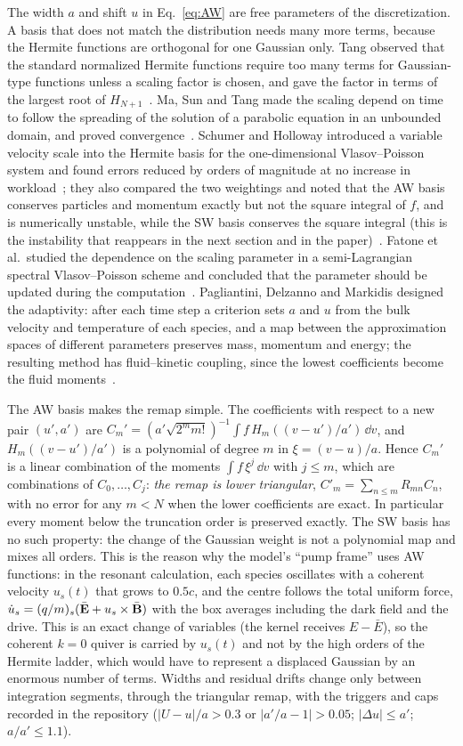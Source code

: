The width $a$ and shift $u$ in Eq.~\eqref{eq:AW} are free parameters of the discretization. A basis that does not match the distribution needs many more terms, because the Hermite functions are orthogonal for one Gaussian only. Tang observed that the standard normalized Hermite functions require too many terms for Gaussian-type functions unless a scaling factor is chosen, and gave the factor in terms of the largest root of $H_{N+1}$~\citep{Tang1993}. Ma, Sun and Tang made the scaling depend on time to follow the spreading of the solution of a parabolic equation in an unbounded domain, and proved convergence~\citep{MaSunTang2005}. Schumer and Holloway introduced a variable velocity scale into the Hermite basis for the one-dimensional Vlasov--Poisson system and found errors reduced by orders of magnitude at no increase in workload~\citep{SchumerHolloway1998}; they also compared the two weightings and noted that the AW basis conserves particles and momentum exactly but not the square integral of $f$, and is numerically unstable, while the SW basis conserves the square integral (this is the instability that reappears in the next section and in the paper)~\citep{SchumerHolloway1998}. Fatone et al.\ studied the dependence on the scaling parameter in a semi-Lagrangian spectral Vlasov--Poisson scheme and concluded that the parameter should be updated during the computation~\citep{Fatone2018}. Pagliantini, Delzanno and Markidis designed the adaptivity: after each time step a criterion sets $a$ and $u$ from the bulk velocity and temperature of each species, and a map between the approximation spaces of different parameters preserves mass, momentum and energy; the resulting method has fluid--kinetic coupling, since the lowest coefficients become the fluid moments~\citep{Pagliantini2023b}.

The AW basis makes the remap simple. The coefficients with respect to a new pair $(u',a')$ are $C_m'=(a'\sqrt{2^mm!})^{-1}\int f\,H_m((v-u')/a')\,\dd v$, and $H_m((v-u')/a')$ is a polynomial of degree $m$ in $\xi=(v-u)/a$. Hence $C_m'$ is a linear combination of the moments $\int f\,\xi^j\,\dd v$ with $j\le m$, which are combinations of $C_0,\dots,C_j$: \emph{the remap is lower triangular}, $C'_m=\sum_{n\le m}R_{mn}C_n$, with no error for any $m<N$ when the lower coefficients are exact. In particular every moment below the truncation order is preserved exactly. The SW basis has no such property: the change of the Gaussian weight is not a polynomial map and mixes all orders. This is the reason why the model's ``pump frame'' uses AW functions: in the resonant calculation, each species oscillates with a coherent velocity $u_s(t)$ that grows to $0.5c$, and the centre follows the total uniform force, $\dot u_s=(q/m)_s(\bar{\bf E}+u_s\times\bar{\bf B})$ with the box averages including the dark field and the drive. This is an exact change of variables (the kernel receives $E-\bar E$), so the coherent $k=0$ quiver is carried by $u_s(t)$ and not by the high orders of the Hermite ladder, which would have to represent a displaced Gaussian by an enormous number of terms. Widths and residual drifts change only between integration segments, through the triangular remap, with the triggers and caps recorded in the repository ($|U-u|/a>0.3$ or $|a'/a-1|>0.05$; $|\Delta u|\le a'$; $a/a'\le1.1$).

